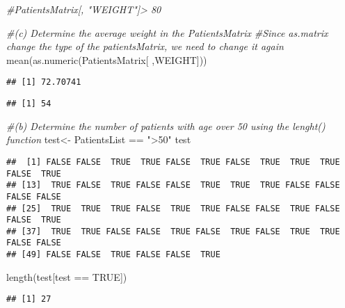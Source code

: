 \documentclass[
]{article}
\newenvironment{Shaded}{\begin{snugshade}}{\end{snugshade}}
\newcommand{\CommentTok}[1]{\textcolor[rgb]{0.56,0.35,0.01}{\textit{#1}}}
\newcommand{\ConstantTok}[1]{\textcolor[rgb]{0.00,0.00,0.00}{#1}}
\newcommand{\FunctionTok}[1]{\textcolor[rgb]{0.00,0.00,0.00}{#1}}
\newcommand{\NormalTok}[1]{#1}
\newcommand{\OtherTok}[1]{\textcolor[rgb]{0.56,0.35,0.01}{#1}}
\newcommand{\SpecialCharTok}[1]{\textcolor[rgb]{0.00,0.00,0.00}{#1}}
\newcommand{\StringTok}[1]{\textcolor[rgb]{0.31,0.60,0.02}{#1}}
\begin{document}
\begin{Shaded}
\begin{Highlighting}[]
\CommentTok{\#PatientsMatrix[, "WEIGHT"]\textgreater{} 80}

\CommentTok{\#(c) Determine the average weight in the PatientsMatrix}
\CommentTok{\#Since as.matrix change the type of the patientsMatrix, we need to change it again}
\FunctionTok{mean}\NormalTok{(}\FunctionTok{as.numeric}\NormalTok{(PatientsMatrix[ ,}\StringTok{\textquotesingle{}WEIGHT\textquotesingle{}}\NormalTok{]))}
\end{Highlighting}
\end{Shaded}

\begin{verbatim}
## [1] 72.70741
\end{verbatim}

\begin{Shaded}
\end{Shaded}

\begin{verbatim}
## [1] 54
\end{verbatim}

\begin{Shaded}
\begin{Highlighting}[]
\CommentTok{\#(b) Determine the number of patients with age over 50 using the lenght() function}
\NormalTok{test}\OtherTok{\textless{}{-}}\NormalTok{ PatientsList }\SpecialCharTok{==} \StringTok{"\textgreater{}50"}
\NormalTok{test}
\end{Highlighting}
\end{Shaded}

\begin{verbatim}
##  [1] FALSE FALSE  TRUE  TRUE FALSE  TRUE FALSE  TRUE  TRUE  TRUE FALSE  TRUE
## [13]  TRUE FALSE  TRUE FALSE FALSE  TRUE  TRUE  TRUE FALSE FALSE FALSE FALSE
## [25]  TRUE  TRUE  TRUE FALSE  TRUE  TRUE FALSE FALSE  TRUE FALSE FALSE  TRUE
## [37]  TRUE  TRUE FALSE FALSE  TRUE FALSE  TRUE FALSE  TRUE  TRUE FALSE FALSE
## [49] FALSE FALSE  TRUE FALSE FALSE  TRUE
\end{verbatim}

\begin{Shaded}
\begin{Highlighting}[]
\FunctionTok{length}\NormalTok{(test[test }\SpecialCharTok{==} \ConstantTok{TRUE}\NormalTok{])}
\end{Highlighting}
\end{Shaded}

\begin{verbatim}
## [1] 27
\end{verbatim}
\end{document}

